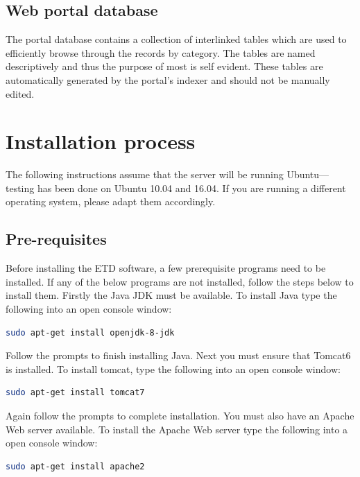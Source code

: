 \documentclass[a4paper,11pt]{article}
\begin{document}
\subsection{Web portal database}

The portal database contains a collection of interlinked tables which are used to efficiently browse through the records by category. The tables are named descriptively and thus the purpose of most is self evident. These tables are automatically generated by the portal's indexer and should not be manually edited.

\section{Installation process}

The following instructions assume that the server will be running Ubuntu---testing has been done on Ubuntu 10.04 and 16.04. If you are running a different operating system, please adapt them accordingly.

\subsection{Pre-requisites}

Before installing the ETD software, a few prerequisite programs need to be installed. If any of the below programs are not installed, follow the steps below to install them. Firstly the Java JDK must be available. To install Java type the following into an open console window: 

\begin{lstlisting}[language=bash]
 sudo apt-get install openjdk-8-jdk
\end{lstlisting}


Follow the prompts to finish installing Java. Next you must ensure that Tomcat6 is installed. To install tomcat, type the following into an open console window: 

\begin{lstlisting}[language=bash]
 sudo apt-get install tomcat7
\end{lstlisting}


Again follow the prompts to complete installation. You must also have an Apache Web server available. To install the Apache Web server type the following into a open console window: 

\begin{lstlisting}[language=bash]
 sudo apt-get install apache2
\end{lstlisting}
\end{document}
